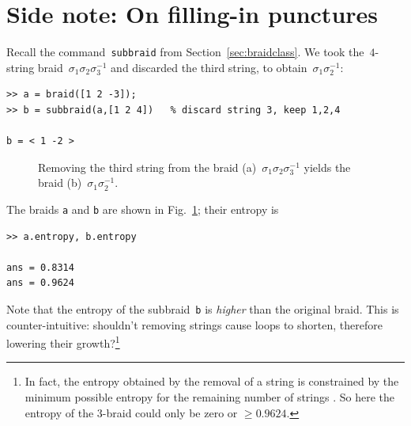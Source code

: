 \documentclass[12pt]{article}
\newcommand{\jlt}[1]{}
\begin{document}
\jlt{List of loops.}

\jlt{Next section: Braid from random walks?  Compute runs of same gen.}


\section{Side note: On filling-in punctures}

Recall the command~\texttt{subbraid} from Section~\ref{sec:braidclass}.  We
took the~$4$-string braid~$\sigma_1\sigma_2\sigma_3^{-1}$ and discarded the
third string, to obtain~$\sigma_1\sigma_2^{-1}$:
\begin{lstlisting}[frame=single,framerule=0pt]
>> a = braid([1 2 -3]);
>> b = subbraid(a,[1 2 4])   % discard string 3, keep 1,2,4

b = < 1 -2 >
\end{lstlisting}
%
\begin{figure}
\begin{center}
\hspace{5em}
\end{center}
\caption{Removing the third string from the braid
  (a)~$\sigma_1\sigma_2\sigma_3^{-1}$ yields the braid
  (b)~$\sigma_1\sigma_2^{-1}$.}
\label{fig:subbraid}
\end{figure}
%
The braids \texttt{a} and \texttt{b} are shown in Fig.~\ref{fig:subbraid};
their entropy is
\begin{lstlisting}[frame=single,framerule=0pt]
>> a.entropy, b.entropy

ans = 0.8314
ans = 0.9624
\end{lstlisting}
Note that the entropy of the subbraid~\texttt{b} is \emph{higher} than the
original braid.  This is counter-intuitive: shouldn't removing strings cause
loops to shorten, therefore lowering their growth?\footnote{In fact, the
  entropy obtained by the removal of a string is constrained by the minimum
  possible entropy for the remaining number of strings
  \citep{Song2002,Hironaka2006,Thiffeault2006,
    Ham2007,Venzke_thesis,LanneauThiffeault2011_braids}.  So here the entropy
  of the 3-braid could only be zero or $\ge 0.9624$.}
\end{document}
